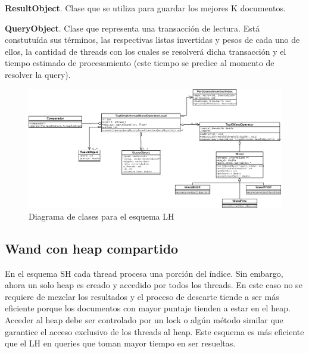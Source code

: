 \begin{list}{}{}
	\item \textbf{ResultObject}. Clase que se utiliza para guardar los mejores K documentos.
	
	\item \textbf{QueryObject}. Clase que representa una transacción de lectura. Está constutuída sus términos,  las respectivas listas invertidas y pesos de cada uno de ellos, la cantidad de threads con los cuales se resolverá dicha transacción y el tiempo estimado de procesamiento (este tiempo se predice al momento de resolver la query).

\end{list}


\begin{figure}[H]
\centering
\includegraphics[scale=.75]{images/TopKMultiThreadWandOperatorLocal.png}
\caption{Diagrama de clases para el esquema LH}
\label{fig:TopKMultiThreadWandOperatorLocal}
\end{figure}


\subsection{Wand con heap compartido}
\label{scheduling:whc}
En el esquema SH cada thread procesa una porción del índice. Sin embargo, ahora un solo heap es creado y accedido por todos los threads. En este caso no se requiere de mezclar los resultados y el proceso de descarte tiende a ser más eficiente porque los documentos con mayor puntaje tienden a estar en el heap. Acceder al heap debe ser controlado por un lock o algún método similar que garantice el acceso exclusivo de los threads al heap. Este esquema es más eficiente que el LH en queries que toman mayor tiempo en ser resueltas.

